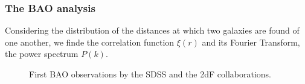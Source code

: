 \documentclass{beamer}
\begin{document}
\begin{frame}[allowframebreaks]
\frametitle{The BAO analysis}
Considering the distribution of the distances at which two galaxies are found of one another, we finde the correlation function $\xi(r)$ and its Fourier Transform, the power spectrum $P(k)$.
\begin{figure}[b] \centering
	\hspace{0.2pt}
	\caption{First BAO observations by the SDSS and the 2dF collaborations.}
	\label{fig:2005-results}
\end{figure}
\end{frame}
\end{document}
